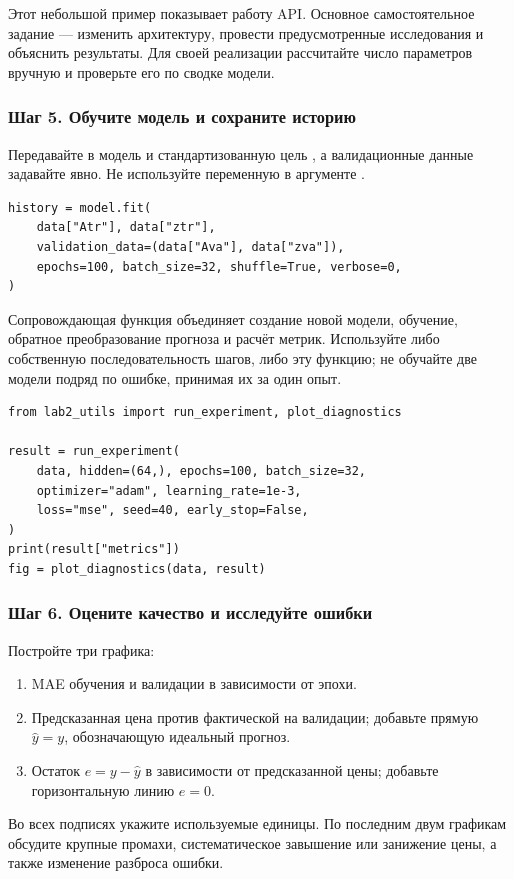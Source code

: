 Этот небольшой пример показывает работу API. Основное самостоятельное
задание --- изменить архитектуру, провести предусмотренные исследования
и объяснить результаты. Для своей реализации рассчитайте число параметров
вручную и проверьте его по сводке модели.

\subsubsection*{Шаг 5. Обучите модель и сохраните историю}
Передавайте в модель  и стандартизованную цель ,
а валидационные данные задавайте явно. Не используйте переменную
 в аргументе .

\begin{lstlisting}
history = model.fit(
    data["Atr"], data["ztr"],
    validation_data=(data["Ava"], data["zva"]),
    epochs=100, batch_size=32, shuffle=True, verbose=0,
)
\end{lstlisting}

Сопровождающая функция  объединяет создание
новой модели, обучение, обратное преобразование прогноза и расчёт метрик.
Используйте либо собственную последовательность шагов, либо эту функцию;
не обучайте две модели подряд по ошибке, принимая их за один опыт.

\begin{lstlisting}
from lab2_utils import run_experiment, plot_diagnostics

result = run_experiment(
    data, hidden=(64,), epochs=100, batch_size=32,
    optimizer="adam", learning_rate=1e-3,
    loss="mse", seed=40, early_stop=False,
)
print(result["metrics"])
fig = plot_diagnostics(data, result)
\end{lstlisting}

\subsubsection*{Шаг 6. Оцените качество и исследуйте ошибки}
Постройте три графика:
\begin{enumerate}
\item MAE обучения и валидации в зависимости от эпохи.
\item Предсказанная цена против фактической на валидации; добавьте прямую
\(\widehat y=y\), обозначающую идеальный прогноз.
\item Остаток \(e=y-\widehat y\) в зависимости от предсказанной цены;
добавьте горизонтальную линию \(e=0\).
\end{enumerate}
Во всех подписях укажите используемые единицы. По последним двум графикам
обсудите крупные промахи, систематическое завышение или занижение цены,
а также изменение разброса ошибки.

